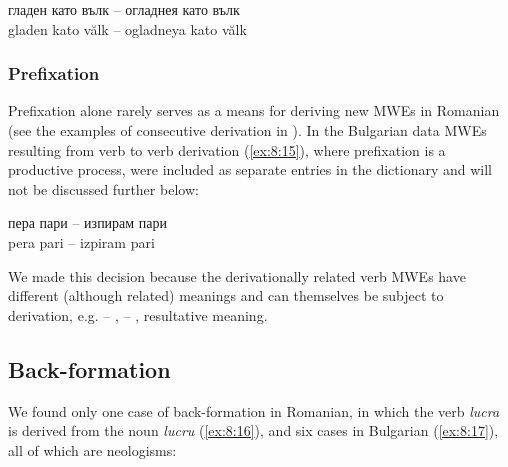 \documentclass[output=paper]{langsci/langscibook}
\begin{document}
\begin{exe}
\ex \label{ex:8:14}
\settowidth{}
\gll гладен като вълк -- огладнея като вълк\\
gladen kato vălk -- ogladneya kato vălk\\ 
\end{exe}

\subsubsection{Prefixation}
\label{prefixation}

Prefixation alone rarely serves as a means for deriving new MWEs in
Romanian (see the examples of consecutive derivation in ). In
the Bulgarian data MWEs resulting from verb to verb derivation (\ref{ex:8:15}),
where prefixation is a productive process, were included as separate
entries in the dictionary and will not be discussed further below:

\begin{exe}
\ex \label{ex:8:15}
\settowidth{}
\gll пера пари -- из\textendash пирам пари\\
pera pari -- iz\textendash piram pari\\ 
\end{exe}

We made this decision because the derivationally related verb MWEs have
different (although related) meanings and can themselves be subject to
derivation, e.g.\@ 
{} -- 
,
 -- 
, resultative
meaning.

\subsection{Back-formation}
\label{backformation}

We found only one case of back-formation in Romanian, in which the verb
\textit{lucra} is derived from the noun \textit{lucru} (\ref{ex:8:16}), and six cases in Bulgarian
(\ref{ex:8:17}), all of which are neologisms:
\end{document}
